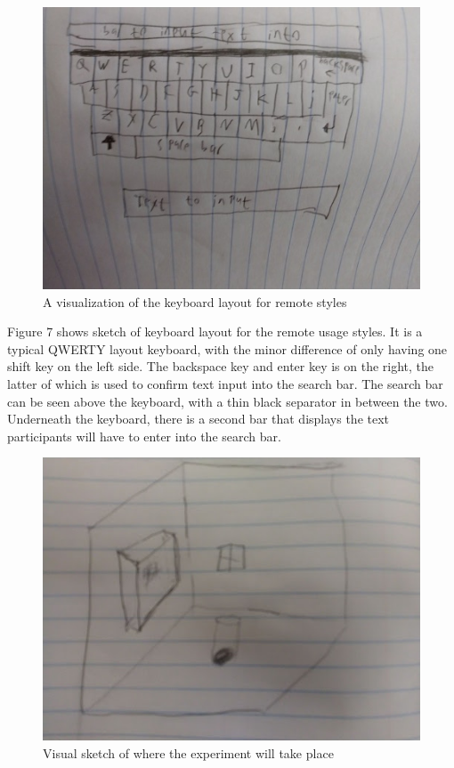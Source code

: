\documentclass{vgtc}                          %
\begin{document}
\begin{figure}[h!]
 \centering %
 \includegraphics[width=\columnwidth]{img1.jpg}
 \caption{A visualization of the keyboard layout for remote styles}
 \label{fig:remote}
\end{figure}
Figure 7 shows sketch of keyboard layout for the remote usage styles. It is a typical QWERTY layout keyboard, with the minor difference of only having one shift key on the left side. The backspace key and enter key is on the right, the latter of which is used to confirm text input into the search bar. The search bar can be seen above the keyboard, with a thin black separator in between the two. Underneath the keyboard, there is a second bar that displays the text participants will have to enter into the search bar. \\[1em]
\begin{figure}[h!]
 \centering %
 \includegraphics[width=\columnwidth]{img2.jpeg}
 \caption{Visual sketch of where the experiment will take place}
 \label{fig:room}
\end{figure}
\end{document}
